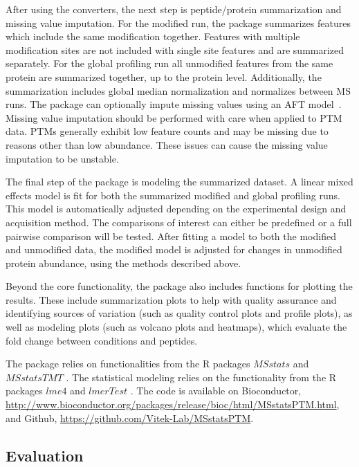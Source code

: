 \documentclass[mcp]{article}
\numberwithin{table}{section}
\begin{document}
After using the converters, the next step is peptide/protein summarization and missing value imputation. For the modified run, the package summarizes features which include the same modification together. Features with multiple modification sites are not included with single site features and are summarized separately. For the global profiling run all unmodified features from the same protein are summarized together, up to the protein level. Additionally, the summarization includes global median normalization and normalizes between MS runs. The package can optionally impute missing values using an AFT model~\cite{Wei:1992}. Missing value imputation should be performed with care when applied to PTM data. PTMs generally exhibit low feature counts and may be missing due to reasons other than low abundance. These issues can cause the missing value imputation to be unstable.

The final step of the package is modeling the summarized dataset. A linear mixed effects model is fit for both the summarized modified and global profiling runs. This model is automatically adjusted depending on the experimental design and acquisition method. The comparisons of interest can either be predefined or a full pairwise comparison will be tested. After fitting a model to both the modified and unmodified data, the modified model is adjusted for changes in unmodified protein abundance, using the methods described above.

Beyond the core functionality, the package also includes functions for plotting the results. These include summarization plots to help with quality assurance and identifying sources of variation (such as quality control plots and profile plots), as well as modeling plots (such as volcano plots and heatmaps), which evaluate the fold change between conditions and peptides. 

The package relies on functionalities from the R packages $MSstats$ \cite{Choi:2014} and $MSstatsTMT$ \cite{Huang:2020}. The statistical modeling relies on the functionality from the R packages $lme4$ \cite{Bates2015} and $lmerTest$ \cite{Kuznetsova2017}. The code is available on Bioconductor, \url{http://www.bioconductor.org/packages/release/bioc/html/MSstatsPTM.html}, and Github, \url{https://github.com/Vitek-Lab/MSstatsPTM}.

\subsection*{Evaluation}
\end{document}
